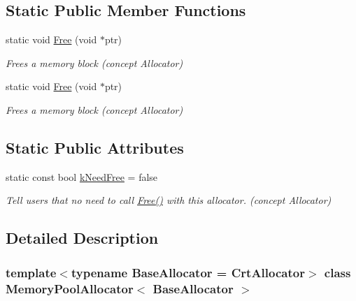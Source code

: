 \subsection*{Static Public Member Functions}
\begin{DoxyCompactItemize}
\item 
\mbox{\label{classMemoryPoolAllocator_a6b180eb150451b4df8b70d827cd1191c}} 
static void \hyperlink{classMemoryPoolAllocator_a6b180eb150451b4df8b70d827cd1191c}{Free} (void $\ast$ptr)
\begin{DoxyCompactList}\small\item\em Frees a memory block (concept Allocator) \end{DoxyCompactList}\item 
\mbox{\label{classMemoryPoolAllocator_a6b180eb150451b4df8b70d827cd1191c}} 
static void \hyperlink{classMemoryPoolAllocator_a6b180eb150451b4df8b70d827cd1191c}{Free} (void $\ast$ptr)
\begin{DoxyCompactList}\small\item\em Frees a memory block (concept Allocator) \end{DoxyCompactList}\end{DoxyCompactItemize}
\subsection*{Static Public Attributes}
\begin{DoxyCompactItemize}
\item 
\mbox{\label{classMemoryPoolAllocator_aff0b66ca297061259822193dda937e4f}} 
static const bool \hyperlink{classMemoryPoolAllocator_aff0b66ca297061259822193dda937e4f}{k\+Need\+Free} = false
\begin{DoxyCompactList}\small\item\em Tell users that no need to call \hyperlink{classMemoryPoolAllocator_a6b180eb150451b4df8b70d827cd1191c}{Free()} with this allocator. (concept Allocator) \end{DoxyCompactList}\end{DoxyCompactItemize}


\subsection{Detailed Description}
\subsubsection*{template$<$typename Base\+Allocator = Crt\+Allocator$>$\newline
class Memory\+Pool\+Allocator$<$ Base\+Allocator $>$}

